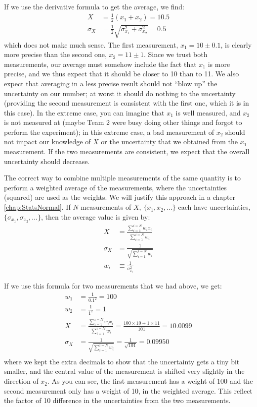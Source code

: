 If we use the derivative formula to get the average, we find:
\begin{align*}
X &= \frac{1}{2} (x_1+x_2)=10.5\\
\sigma_{X} &= \frac{1}{2}\sqrt{\sigma_{x_1}^2+\sigma_{x_2}^2}=0.5
\end{align*}
which does not make much sense. The first measurement, $x_1=10 \pm 0.1$, is clearly more precise than the second one, $x_2=11 \pm 1$. Since we trust both measurements, our average must somehow include the fact that $x_1$ is more precise, and we thus expect that it should be closer to 10 than to 11. We also expect that averaging in a less precise result should not ``blow up'' the uncertainty on our number; at worst it should do nothing to the uncertainty (providing the second measurement is consistent with the first one, which it is in this case). In the extreme case, you can imagine that $x_1$ is well measured, and $x_2$ is not measured at (maybe Team 2 were busy doing other things and forgot to perform the experiment); in this extreme case, a bad measurement of $x_2$ should not impact our knowledge of $X$ or the uncertainty that we obtained from the $x_1$ measurement. If the two measurements are consistent, we expect that the overall uncertainty should decrease. 

The correct way to combine multiple measurements of the same quantity is to perform a weighted average of the measurements, where the uncertainties (squared) are used as the weights. We will justify this approach in a chapter \ref{chap:StatsNormal}. If $N$ measurements of $X$, $\{x_1, x_2 ,\dots\}$ each have uncertainties, $\{\sigma_{x_1}, \sigma_{x_2} ,\dots\}$, then the average value is given by:
\begin{align*}
X &= \frac{\sum_{i=1}^{i=N}w_ix_i}{\sum_{i=1}^{i=N}w_i}\\
\sigma_{X} &= \frac{1}{\sqrt{\sum_{i=1}^{i=N}w_i}}\\
w_i&\equiv\frac{1}{\sigma_{x_i}^2}
\end{align*}

If we use this formula for two measurements that we had above, we get:
\begin{align*}
w_1 &= \frac{1}{0.1^2}=100\\
w_2 &= \frac{1}{1^2}=1\\
X &= \frac{\sum_{i=1}^{i=N}w_ix_i}{\sum_{i=1}^{i=N}w_i}=\frac{100\times 10+1\times 11}{101}=10.0099\\
\sigma_{X} &= \frac{1}{\sqrt{\sum_{i=1}^{i=N}w_i}}=\frac{1}{\sqrt{101}}=0.09950\\
\end{align*}
where we kept the extra decimals to show that the uncertainty gets a tiny bit smaller, and the central value of the measurement is shifted very slightly in the direction of $x_2$. As you can see, the first measurement has a weight of 100 and the second measurement only has a weight of 10, in the weighted average. This reflect the factor of 10 difference in the uncertainties from the two measurements. 

